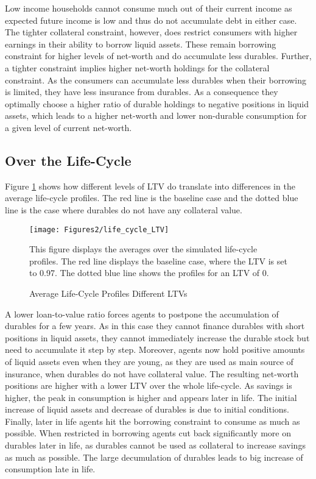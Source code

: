 \documentclass[a4paper,12pt,legno]{article}
\begin{document}
Low income households cannot consume much out of their current income as expected future income is low and thus do not accumulate debt in either case. The tighter collateral constraint, however, does restrict consumers with higher earnings in their ability to borrow liquid assets. These remain borrowing constraint for higher levels of net-worth and do accumulate less durables. Further, a tighter constraint implies higher net-worth holdings for the collateral constraint. As the consumers can accumulate less durables when their borrowing is limited, they have less insurance from durables. As a consequence they optimally choose a higher ratio of durable holdings to negative positions in liquid assets, which leads to a higher net-worth and lower non-durable consumption for a given level of current net-worth.

\subsection{Over the Life-Cycle}
Figure \ref{downpayment_vs_baseline_lc} shows how different levels of LTV do translate into differences in the average life-cycle profiles. The red line is the baseline case and the dotted blue line is the case where durables do not have any collateral value. \begin{figure}[!htbp]
\caption{Average Life-Cycle Profiles Different LTVs} 
\label{downpayment_vs_baseline_lc}	%
\centering
\texttt{[image: Figures2/life\_cycle\_LTV]}  %

\begin{minipage}{0.8\linewidth}
\footnotesize{This figure displays the averages over the simulated life-cycle profiles. The red line displays the baseline case, where the LTV is set to 0.97. The dotted blue line shows the profiles for an LTV of 0.}
\end{minipage}

\end{figure}A lower loan-to-value ratio forces agents to  postpone the accumulation of durables for a few years. As in this case they cannot finance durables with short positions in liquid assets, they cannot immediately increase the durable stock but need to accumulate it step by step. Moreover, agents now hold positive amounts of liquid assets even when they are young, as they are used as main source of insurance, when durables do not have collateral value. The resulting net-worth positions are higher with a lower LTV over the whole life-cycle. As savings is higher, the peak in consumption is higher and appears later in life.
The initial increase of liquid assets and decrease of durables is due to initial conditions. Finally, later in life agents hit the borrowing constraint to consume as much as possible. When restricted in borrowing agents cut back significantly more on durables later in life, as durables cannot be used as collateral to increase savings as much as possible. The large decumulation of durables leads to big increase of consumption late in life. 
\end{document}
